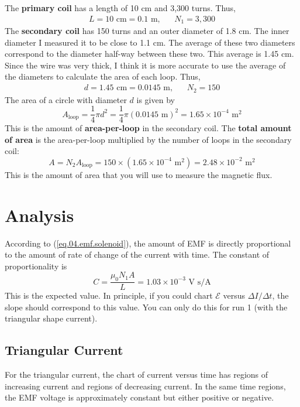 The \textbf{primary coil} has a length of 10 cm and 3,300 turns. Thus,
\begin{align}
	L = 10 \text{ cm} = 0.1 \text{ m}, && N_{1} = 3,300
\end{align}
The \textbf{secondary coil} has 150 turns and an outer diameter of 1.8 cm. The inner diameter I measured it to be close to 1.1 cm. The average of these two diameters correspond to the diameter half-way between these two. This average is 1.45 cm. Since the wire was very thick, I think it is more accurate to use the average of the diameters to calculate the area of each loop. Thus,
\begin{align}
	d = 1.45 \text{ cm} = 0.0145 \text{ m}, && N_{2} = 150
\end{align}
The area of a circle with diameter $d$ is given by
\begin{equation}
	A_{\text{loop}} = \frac{1}{4} \pi d^{2} = \frac{1}{4} \pi (0.0145 \text{ m})^2 = 1.65 \times 10^{-4} \text{ m}^{2}
\end{equation}
This is the amount of \textbf{area-per-loop} in the secondary coil. The \textbf{total amount of area} is the area-per-loop multiplied by the number of loops in the secondary coil:
\begin{equation}
	A = N_{2} A_{\text{loop}} = 150 \times (1.65 \times 10^{-4} \text{ m}^{2}) = 2.48 \times 10^{-2} \text{ m}^{2}
\end{equation}
This is the amount of area that you will use to measure the magnetic flux.
\section{Analysis}
According to (\ref{eq.04.emf.solenoid}), the amount of EMF is directly proportional to the amount of rate of change of the current with time. The constant of proportionality is
\begin{equation}
	C = \frac{\mu_{0} N_{1} A}{L} = 1.03 \times 10^{-3} \text{ V s/A}
	\label{eq.04.slope}
\end{equation}
This is the expected value. In principle, if you could chart $\mathcal{E}$ versus $\Delta I / \Delta t$, the slope should correspond to this value. You can only do this for run 1 (with the triangular shape current).
\subsection{Triangular Current}
For the triangular current, the chart of current versus time has regions of increasing current and regions of decreasing current. In the same time regions, the EMF voltage is approximately constant but either positive or negative.

